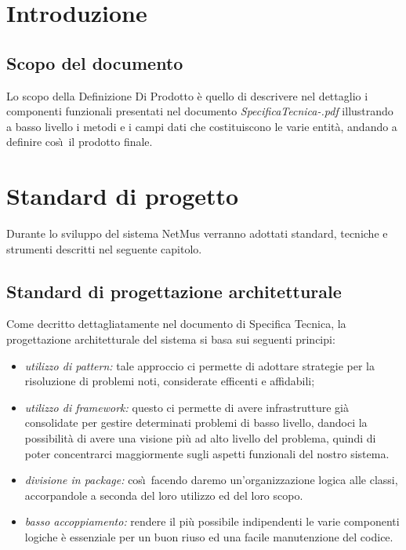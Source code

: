 \tableofcontents

\chapter{Introduzione}
\thispagestyle{fancy} %

\section{Scopo del documento}
Lo scopo della Definizione Di Prodotto \`e quello di descrivere nel dettaglio i
componenti funzionali presentati nel documento
\emph{SpecificaTecnica-\versionespecifica.pdf} illustrando a basso livello i
metodi e i campi dati che costituiscono le varie entit\`a, andando a definire
cos\`\i\ il prodotto finale.



\chapter{Standard di progetto}
\thispagestyle{fancy} %
Durante lo sviluppo del sistema NetMus verranno adottati standard,
tecniche e strumenti descritti nel seguente capitolo.

\section{Standard di progettazione architetturale}
Come decritto dettagliatamente nel documento di Specifica Tecnica, la
progettazione architetturale del sistema si basa sui seguenti principi:

\begin{itemize}
  \item \emph{utilizzo di pattern:} tale approccio ci permette di adottare
  strategie per la risoluzione di problemi noti, considerate efficenti e affidabili;
  \item \emph{utilizzo di framework:} questo ci permette di avere infrastrutture
  gi\`a consolidate per gestire determinati problemi di basso livello, dandoci
  la possibilit\`a di avere una visione pi\`u ad alto livello del problema,
  quindi di poter concentrarci maggiormente sugli aspetti funzionali del nostro
  sistema.
  \item \emph{divisione in package:} cos\`\i\ facendo daremo un'organizzazione
  logica alle classi, accorpandole a seconda del loro utilizzo ed del loro
  scopo.
  \item \emph{basso accoppiamento:} rendere il pi\`u possibile indipendenti le
  varie componenti logiche \`e essenziale per un buon riuso ed una facile
  manutenzione del codice.
\end{itemize}

